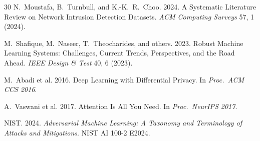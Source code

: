 \documentclass[sigconf,nonacm]{acmart}
\begin{document}
\begin{thebibliography}{30}
N.~Moustafa, B.~Turnbull, and K.-K.~R.~Choo. 2024. A Systematic
Literature Review on Network Intrusion Detection Datasets.
\textit{ACM Computing Surveys} 57, 1 (2024).

M.~Shafique, M.~Naseer, T.~Theocharides, and others. 2023. Robust
Machine Learning Systems: Challenges, Current Trends,
Perspectives, and the Road Ahead. \textit{IEEE Design \& Test}
40, 6 (2023).

M.~Abadi et al. 2016. Deep Learning with Differential Privacy.
In \textit{Proc.\ ACM CCS 2016}.

A.~Vaswani et al. 2017. Attention Is All You Need.
In \textit{Proc.\ NeurIPS 2017}.

NIST. 2024. \textit{Adversarial Machine Learning: A Taxonomy and
Terminology of Attacks and Mitigations}. NIST AI 100-2 E2024.

\end{thebibliography}
\end{document}
